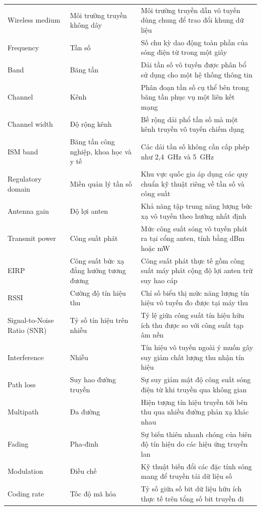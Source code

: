 \begin{xltabular}{\linewidth}{@{} L{0.8} L{0.8} L{1.4} @{}}
  Wireless medium & Môi trường truyền không dây & Môi trường truyền dẫn vô tuyến dùng chung để trao đổi khung dữ liệu\\
  Frequency & Tần số & Số chu kỳ dao động toàn phần của sóng điện từ trong một giây\\
  Band & Băng tần & Dải tần số vô tuyến được phân bổ sử dụng cho một hệ thống thông tin\\
  Channel & Kênh & Phân đoạn tần số cụ thể bên trong băng tần phục vụ một liên kết mạng\\
  Channel width & Độ rộng kênh & Bề rộng dải phổ tần số mà một kênh truyền vô tuyến chiếm dụng\\
  ISM band & Băng tần công nghiệp, khoa học và y tế & Các dải tần số không cần cấp phép như 2,4~GHz và 5~GHz\\
  Regulatory domain & Miền quản lý tần số & Khu vực quốc gia áp dụng các quy chuẩn kỹ thuật riêng về tần số và công suất\\
  Antenna gain & Độ lợi anten & Khả năng tập trung năng lượng bức xạ vô tuyến theo hướng nhất định\\
  Transmit power & Công suất phát & Mức công suất sóng vô tuyến phát ra tại cổng anten, tính bằng dBm hoặc mW\\
  EIRP & Công suất bức xạ đẳng hướng tương đương & Công suất phát thực tế gồm công suất máy phát cộng độ lợi anten trừ suy hao cáp\\
  RSSI & Cường độ tín hiệu thu & Chỉ số biểu thị mức năng lượng tín hiệu vô tuyến đo được tại máy thu\\
  Signal-to-Noise Ratio (SNR) & Tỷ số tín hiệu trên nhiễu & Tỷ lệ giữa công suất tín hiệu hữu ích thu được so với công suất tạp âm nền\\
  Interference & Nhiễu & Tín hiệu vô tuyến ngoài ý muốn gây suy giảm chất lượng thu nhận tín hiệu\\
  Path loss & Suy hao đường truyền & Sự suy giảm mật độ công suất sóng điện từ khi truyền qua không gian\\
  Multipath & Đa đường & Hiện tượng tín hiệu truyền tới bên thu qua nhiều đường phản xạ khác nhau\\
  Fading & Pha-đinh & Sự biến thiên nhanh chóng của biên độ tín hiệu do các hiệu ứng truyền lan\\
  Modulation & Điều chế & Kỹ thuật biến đổi các đặc tính sóng mang để truyền tải dữ liệu số\\
  Coding rate & Tốc độ mã hóa & Tỷ số giữa số bit dữ liệu hữu ích thực tế trên tổng số bit truyền đi\\

\end{xltabular}
